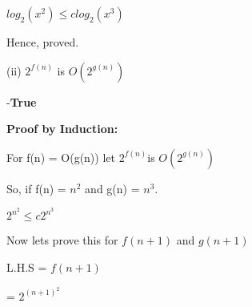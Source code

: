 \documentclass[letterpaper,portrait,12pt]{article}
\begin{document}
\begin{flushleft}
$log_2(x^2) \le clog_2(x^3)$
\end{flushleft}


\begin{flushleft}
Hence, proved.
\end{flushleft}


\begin{flushleft}
(ii) $2^{f(n)}$ is $O(2^{g(n)})$
\end{flushleft}


\begin{flushleft}
-\textbf{True}
\end{flushleft}


\begin{flushleft}
\textbf{Proof by Induction:}
\end{flushleft}


\begin{flushleft}
For f(n) = O(g(n)) let $2^{f(n)}$is $O(2^{g(n)})$
\end{flushleft}


\begin{flushleft}
So, if f(n) = $n^2$ and g(n) = $n^3$.
\end{flushleft}


\begin{flushleft}

\end{flushleft}


\begin{flushleft}
$2^{n^2} \le c  2^{n^3}$ 
\end{flushleft}


\begin{flushleft}

\end{flushleft}


\begin{flushleft}
Now lets prove this for $f(n+1)$ and $g(n+1)$
\end{flushleft}


\begin{flushleft}

\end{flushleft}


\begin{flushleft}
L.H.S  = $f(n+1)$
\end{flushleft}


\begin{flushleft}
	= $2^{(n+1)^2}$
\end{flushleft}
\end{document}
